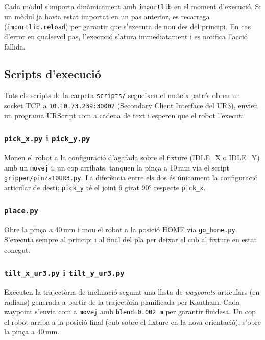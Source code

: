 \documentclass[12pt, a4paper]{article}
\begin{document}
Cada mòdul s'importa dinàmicament amb \texttt{importlib} en el moment d'execució. Si un mòdul ja havia estat importat en un pas anterior, es recarrega (\texttt{importlib.reload}) per garantir que s'executa de nou des del principi. En cas d'error en qualsevol pas, l'execució s'atura immediatament i es notifica l'acció fallida.

\subsection{Scripts d'execució}

Tots els scripts de la carpeta \texttt{scripts/} segueixen el mateix patró: obren un socket TCP a \texttt{10.10.73.239:30002} (Secondary Client Interface del UR3), envien un programa URScript com a cadena de text i esperen que el robot l'executi.

\subsubsection{\texttt{pick\_x.py} i \texttt{pick\_y.py}}

Mouen el robot a la configuració d'agafada sobre el fixture (IDLE\_X o IDLE\_Y) amb un \texttt{movej} i, un cop arribats, tanquen la pinça a 10\,mm via el script \texttt{gripper/pinza10UR3.py}. La diferència entre els dos és únicament la configuració articular de destí: \texttt{pick\_y} té el joint 6 girat 90° respecte \texttt{pick\_x}.

\subsubsection{\texttt{place.py}}

Obre la pinça a 40\,mm i mou el robot a la posició HOME via \texttt{go\_home.py}. S'executa sempre al principi i al final del pla per deixar el cub al fixture en estat conegut.

\subsubsection{\texttt{tilt\_x\_ur3.py} i \texttt{tilt\_y\_ur3.py}}

Executen la trajectòria de inclinació seguint una llista de \textit{waypoints} articulars (en radians) generada a partir de la trajectòria planificada per Kautham. Cada waypoint s'envia com a \texttt{movej} amb \texttt{blend=0.002\,m} per garantir fluïdesa. Un cop el robot arriba a la posició final (cub sobre el fixture en la nova orientació), s'obre la pinça a 40\,mm.
\end{document}
